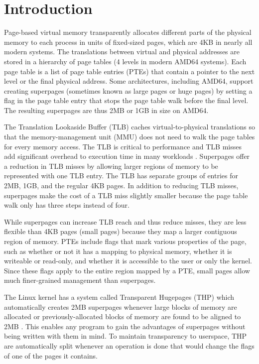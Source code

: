 \chapter{Introduction}

Page-based virtual memory transparently allocates different parts of the physical memory to each process in units of fixed-sized pages, which are 4KB in nearly all modern systems. The translations between virtual and physical addresses are stored in a hierarchy of page tables (4 levels in modern AMD64 systems). Each page table is a list of page table entries (PTEs) that contain a pointer to the next level or the final physical address. Some architectures, including AMD64, support creating superpages (sometimes known as large pages or huge pages) by setting a flag in the page table entry that stops the page table walk before the final level. The resulting superpages are thus 2MB or 1GB in size on AMD64.

The Translation Lookaside Buffer (TLB) caches virtual-to-physical translations so that the memory-management unit (MMU) does not need to walk the page tables for every memory access. The TLB is critical to performance and TLB misses add significant overhead to execution time in many workloads \cite{Barr}. Superpages offer a reduction in TLB misses by allowing larger regions of memory to be represented with one TLB entry. The TLB has separate groups of entries for 2MB, 1GB, and the regular 4KB pages. In addition to reducing TLB misses, superpages make the cost of a TLB miss slightly smaller because the page table walk only has three steps instead of four.

While superpages can increase TLB reach and thus reduce misses, they are less flexible than 4KB pages (small pages) because they map a larger contiguous region of memory. PTEs include flags that mark various properties of the page, such as whether or not it has a mapping to physical memory, whether it is writeable or read-only, and whether it is accessible to the user or only the kernel. Since these flags apply to the entire region mapped by a PTE, small pages allow much finer-grained management than superpages.

The Linux kernel has a system called Transparent Hugepages (THP) which automatically creates 2MB superpages whenever large blocks of memory are allocated or previously-allocated blocks of memory are found to be aligned to 2MB \cite{THP}. This enables any program to gain the advantages of superpages without being written with them in mind. To maintain transparency to userspace, THP are automatically split whenever an operation is done that would change the flags of one of the pages it contains.

